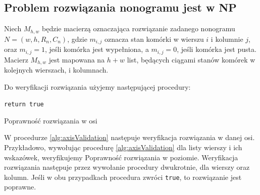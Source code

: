 \subsection{Problem rozwiązania nonogramu jest w NP}
    Niech $M_{h, w}$ będzie macierzą oznaczająca rozwiązanie zadanego nonogramu $N = (w, h, R_n, C_n)$,
gdzie $m_{i, j}$ oznacza stan komórki w wierszu $i$ i kolumnie $j$, oraz $m_{i, j} = 1$, jeśli komórka
jest wypełniona, a $m_{i, j} = 0$, jeśli komórka jest pusta. Macierz $M_{h, w}$ jest mapowana na $h + w$ list,
będących ciągami stanów komórek w kolejnych wierszach, i kolumnach.

    Do weryfikacji rozwiązania użyjemy następującej procedury:

\begin{pseudokod}[H]
    \texttt{return true}\;
    \caption{Poprawność rozwiązania w osi}\label{alg:axisValidation}
\end{pseudokod}

    W procedurze \ref{alg:axisValidation} następuje weryfikacja rozwiązania w danej osi. Przykładowo,
wywołując procedurę \ref{alg:axisValidation} dla listy wierszy i ich wskazówek, weryfikujemy Poprawność
rozwiązania w poziomie. Weryfikacja rozwiązania następuje przez wywołanie procedury dwukrotnie,
dla wierszy oraz kolumn. Jeśli w obu przypadkach procedura zwróci \texttt{true}, to rozwiązanie jest poprawne.

